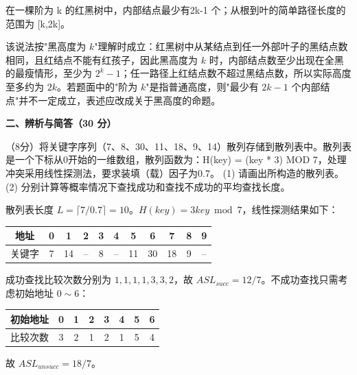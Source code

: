 \begin{question}
在一棵阶为 k 的红黑树中，内部结点最少有2k-1 个；从根到叶的简单路径长度的范围为 [k,2k]。
\begin{solution}
该说法按"黑高度为 $k$"理解时成立：红黑树中从某结点到任一外部叶子的黑结点数相同，且红结点不能有红孩子，因此黑高度为 $k$ 时，内部结点数至少出现在全黑的最瘦情形，至少为 $2^k-1$；任一路径上红结点数不超过黑结点数，所以实际高度至多约为 $2k$。若题面中的"阶为 $k$"是指普通高度，则"最少有 $2k-1$ 个内部结点"并不一定成立，表述应改成关于黑高度的命题。
\end{solution}
\end{question}

\textbf{二、辨析与简答（30 分）}
\begin{question}
（8分）将关键字序列（7、8、30、11、18、9、14）散列存储到散列表中。散列表是一个下标从0开始的一维数组，散列函数为：H(key) = (key * 3) MOD 7，处理冲突采用线性探测法，要求装填（载）因子为0.7。
(1) 请画出所构造的散列表。
(2) 分别计算等概率情况下查找成功和查找不成功的平均查找长度。
\begin{solution}
散列表长度 $L=\lceil 7/0.7\rceil=10$。$H(key)=3key\bmod 7$，线性探测结果如下：
  \begin{center}
  \begin{tabular}{c|cccccccccc}
  地址 &0&1&2&3&4&5&6&7&8&9\\ \hline
  关键字&7&14&--&8&--&11&30&18&9&--
  \end{tabular}
  \end{center}
  成功查找比较次数分别为 $1,1,1,1,3,3,2$，故 $ASL_{succ}=12/7$。不成功查找只需考虑初始地址 $0\sim6$：
  \begin{center}
  \begin{tabular}{c|ccccccc}
  初始地址&0&1&2&3&4&5&6\\ \hline
  比较次数&3&2&1&2&1&5&4
  \end{tabular}
  \end{center}
  故 $ASL_{unsucc}=18/7$。
\end{solution}
\end{question}

